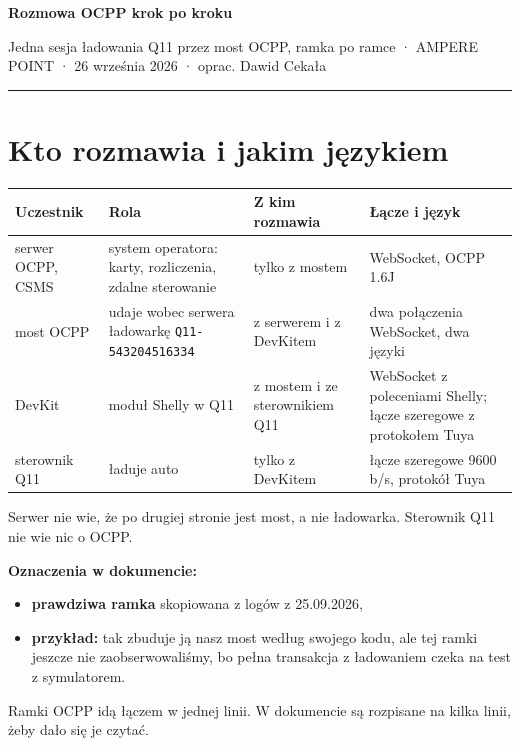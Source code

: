 \documentclass[11pt,a4paper]{article}
\begin{document}
{\LARGE\bfseries Rozmowa OCPP krok po kroku\par}
{\large Jedna sesja ładowania Q11 przez most OCPP, ramka po ramce · AMPERE POINT · 26 września 2026 · oprac. Dawid Cekała\par}
\vspace{4pt}\textcolor{apteal}{\rule{\textwidth}{1.2pt}}

\section*{Kto rozmawia i jakim językiem}

\begin{longtable}{>{\raggedright\arraybackslash}p{3.00cm}>{\raggedright\arraybackslash}p{3.97cm}>{\raggedright\arraybackslash}p{2.83cm}>{\raggedright\arraybackslash}p{5.05cm}}
\toprule
\rowcolor{apteallight}\textbf{Uczestnik} & \textbf{Rola} & \textbf{Z kim rozmawia} & \textbf{Łącze i język} \\
\midrule\endhead
\bottomrule\endfoot
serwer OCPP, CSMS & system operatora: karty, rozliczenia, zdalne sterowanie & tylko z mostem & WebSocket, OCPP 1.6J \\
most OCPP & udaje wobec serwera ładowarkę \texttt{Q11-\allowbreak{}543204516334} & z serwerem i z DevKitem & dwa połączenia WebSocket, dwa języki \\
DevKit & moduł Shelly w Q11 & z mostem i ze sterownikiem Q11 & WebSocket z poleceniami Shelly; łącze szeregowe z protokołem Tuya \\
sterownik Q11 & ładuje auto & tylko z DevKitem & łącze szeregowe 9600 b/s, protokół Tuya \\
\end{longtable}

Serwer nie wie, że po drugiej stronie jest most, a nie ładowarka. Sterownik Q11 nie wie nic o OCPP.


\textbf{Oznaczenia w dokumencie:}

\begin{itemize}
\item {} \textbf{prawdziwa ramka} skopiowana z logów z 25.09.2026,
\item {} \textbf{przykład:} tak zbuduje ją nasz most według swojego kodu, ale tej ramki jeszcze nie zaobserwowaliśmy, bo pełna transakcja z ładowaniem czeka na test z symulatorem.
\end{itemize}

Ramki OCPP idą łączem w jednej linii. W dokumencie są rozpisane na kilka linii, żeby dało się je czytać.
\end{document}
